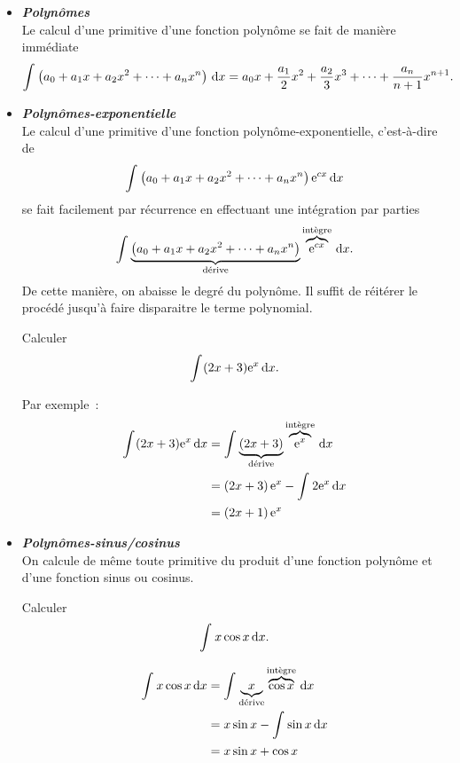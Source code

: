 \documentclass{magnolia}
\begin{document}
\begin{itemize}
\item \emph{\bf Polynômes}\\
  Le calcul d'une primitive d'une fonction polynôme se fait de manière
  immédiate
  $$\int_{}^{} \left(a_0+a_1 x+a_2 x^2+\dots+a_n x^n\right)\,\text{d}x=
    a_0 x+\frac{a_1}{2}x^2+\frac{a_2}{3}x^3+\dots+\frac{a_n}{n+1}x^{n+1}.$$
\item \emph{\bf Polynômes-exponentielle}\\
  Le calcul d'une primitive d'une fonction polynôme-exponentielle,
  c'est-à-dire de
  $$\int_{}^{} \left(a_0+a_1 x+a_2 x^2+\dots+a_n x^n\right){\rm e}^{cx}\,\text{d}x$$
  se fait facilement par récurrence en effectuant une intégration par
  parties
  $$\int_{}^{} \underbrace{\left(a_0+a_1 x+a_2 x^2+\dots+a_n x^n\right)}_{\text{d\'erive}} \overbrace{{\rm e}^{cx}}^{\text{int\`egre}}\,\text{d}x.$$
  De cette manière, on abaisse le degré du polynôme. Il suffit de réitérer
  le procédé jusqu'à faire disparaitre le terme polynomial.
  \begin{exoUnique}
  \exo Calculer
    \[\int_{}^{} (2x+3){\rm e}^x\,\text{d}x.\]
    \begin{sol}
  Par exemple~:
  \begin{equation*}
  \begin{split}
  \int_{}^{} (2x+3){\rm e}^x\,\text{d}x&=\int_{}^{} \underbrace{\left(2x+3\right)}_{\text{d\'erive}} \overbrace{{\rm e}^x}^{\text{int\`egre}}\,\text{d}x\\
                     &=\left(2x+3\right){\rm e}^x-\int_{}^{} 2{\rm e}^x\,\text{d}x\\
                     &=\left(2x+1\right){\rm e}^x
  \end{split}
  \end{equation*}
    \end{sol}
  \end{exoUnique}
\item \emph{\bf Polynômes-sinus/cosinus}\\
  On calcule de même toute primitive du produit d'une fonction polynôme
  et d'une fonction sinus ou cosinus.
  \begin{exoUnique}
  \exo Calculer
    \[\int_{}^{} x\cos x\,\text{d}x.\]
    \begin{sol}
  \begin{equation*}
  \begin{split}
  \int_{}^{} x\cos x\,\text{d}x&=\int_{}^{} \underbrace{x}_{\text{d\'erive}} \overbrace{\cos x}^{\text{int\`egre}}\,\text{d}x\\
                   &=x\sin x-\int_{}^{} \sin x\,\text{d}x\\
                   &=x\sin x+\cos x    
  \end{split}
  \end{equation*}
    \end{sol}
  \end{exoUnique}

\end{itemize}
\end{document}
